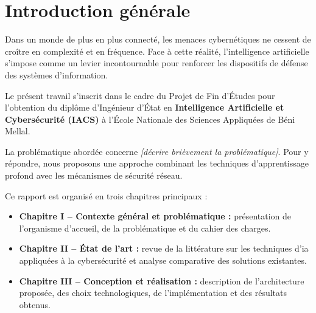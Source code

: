 \chapter*{Introduction générale}

\hspace{1cm}Dans un monde de plus en plus connecté, les menaces cybernétiques ne cessent de croître en complexité et en fréquence. Face à cette réalité, l'intelligence artificielle s'impose comme un levier incontournable pour renforcer les dispositifs de défense des systèmes d'information.

Le présent travail s'inscrit dans le cadre du Projet de Fin d'Études pour l'obtention du diplôme d'Ingénieur d'État en \textbf{Intelligence Artificielle et Cybersécurité (IACS)} à l'École Nationale des Sciences Appliquées de Béni Mellal.

\vspace{0.5cm}
La problématique abordée concerne \textit{[décrire brièvement la problématique]}. Pour y répondre, nous proposons une approche combinant les techniques d'apprentissage profond avec les mécanismes de sécurité réseau.

\vspace{0.5cm}
Ce rapport est organisé en trois chapitres principaux :

\begin{itemize}
  \item \textbf{Chapitre I -- Contexte général et problématique :} présentation de l'organisme d'accueil, de la problématique et du cahier des charges.
  \item \textbf{Chapitre II -- État de l'art :} revue de la littérature sur les techniques d'\gls{ia} appliquées à la cybersécurité et analyse comparative des solutions existantes.
  \item \textbf{Chapitre III -- Conception et réalisation :} description de l'architecture proposée, des choix technologiques, de l'implémentation et des résultats obtenus.
\end{itemize}
